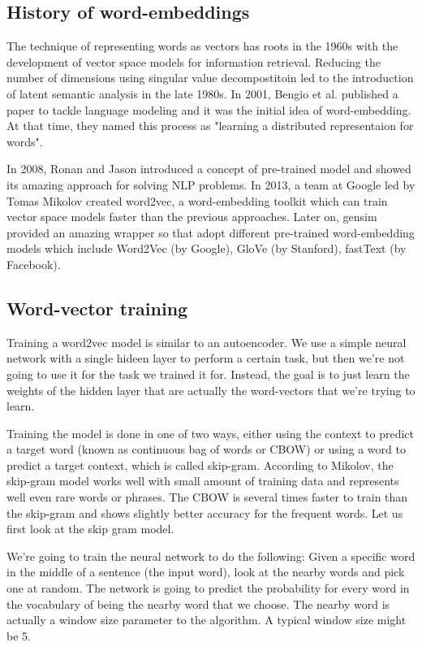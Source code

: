 \newpage
\subsection{History of word-embeddings}

The technique of representing words as vectors has roots in the 1960s with the development of vector space models for information retrieval. Reducing the number of dimensions using singular value decompostitoin led to the introduction of latent semantic analysis in the late 1980s. In 2001, Bengio et al. published a paper to tackle language modeling and it was the initial idea of word-embedding. At that time, they named this process as "learning a distributed representaion for words".

In 2008, Ronan and Jason introduced a concept of pre-trained model and showed its amazing approach for solving NLP problems. In 2013, a team at Google led by Tomas Mikolov created word2vec, a word-embedding toolkit which can train vector space models faster than the previous approaches. Later on, gensim provided an amazing wrapper so that adopt different pre-trained word-embedding models which include Word2Vec (by Google), GloVe (by Stanford), fastText (by Facebook).

\subsection{Word-vector training}

Training a word2vec model is similar to an autoencoder. We use a simple neural network with a single hideen layer to perform a certain task, but then we're not going to use it for the task we trained it for. Instead, the goal is to just learn the weights of the hidden layer that are actually the word-vectors that we're trying to learn.

Training the model is done in one of two ways, either using the context to predict a target word (known as continuous bag of words or CBOW) or using a word to predict a target context, which is called skip-gram. According to Mikolov, the skip-gram model works well with small amount of training data and represents well even rare words or phrases. The CBOW is several times faster to train than the skip-gram and shows slightly better accuracy for the frequent words. Let us first look at the skip gram model.

We're going to train the neural network to do the following: Given a specific word in the middle of a sentence (the input word), look at the nearby words and pick one at random. The network is going to predict the probability for every word in the vocabulary of being the nearby word that we choose. The nearby word is actually a window size parameter to the algorithm. A typical window size might be 5.

